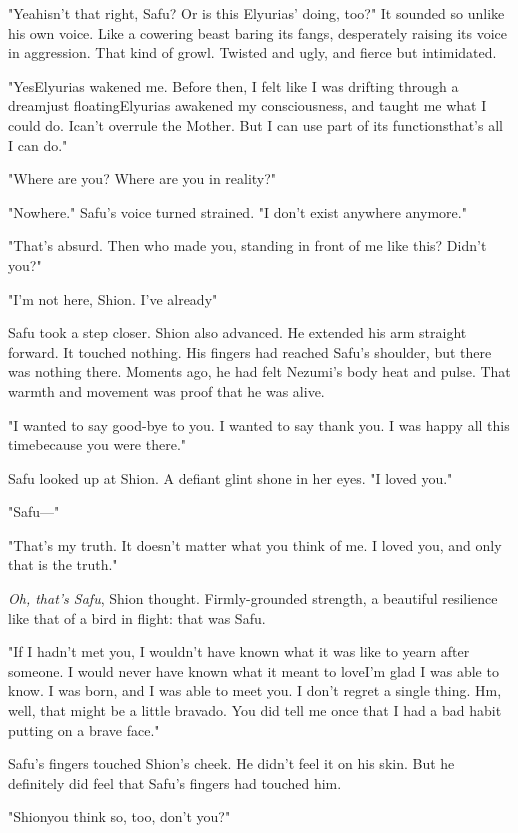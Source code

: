 "Yeah\el isn't that right, Safu? Or is this Elyurias' doing, too?" It
sounded so unlike his own voice. Like a cowering beast baring its fangs,
desperately raising its voice in aggression. That kind of growl. Twisted
and ugly, and fierce but intimidated.

"Yes\el Elyurias wakened me. Before then, I felt like I was drifting
through a dream\el just floating\el Elyurias awakened my consciousness,
and taught me what I could do. I\el can't overrule the Mother. But I can
use part of its functions\el that's all I can do."

"Where are you? Where are you in reality?"

"Nowhere." Safu's voice turned strained. "I don't exist anywhere
anymore."

"That's absurd. Then who made you, standing in front of me like this?
Didn't you?"

"I'm not here, Shion. I've already\el "

Safu took a step closer. Shion also advanced. He extended his arm
straight forward. It touched nothing. His fingers had reached Safu's
shoulder, but there was nothing there. Moments ago, he had felt Nezumi's
body heat and pulse. That warmth and movement was proof that he was
alive.

"I wanted to say good-bye to you. I wanted to say thank you. I was happy
all this time\el because you were there."

Safu looked up at Shion. A defiant glint shone in her eyes. "I loved
you."

"Safu---"

"That's my truth. It doesn't matter what you think of me. I loved you,
and only that is the truth."

\emph{Oh, that's Safu}, Shion thought. Firmly-grounded strength, a beautiful
resilience like that of a bird in flight: that was Safu.

"If I hadn't met you, I wouldn't have known what it was like to yearn
after someone. I would never have known what it meant to love\el I'm
glad I was able to know. I was born, and I was able to meet you. I don't
regret a single thing. Hm, well, that might be a little bravado. You did
tell me once that I had a bad habit putting on a brave face."

Safu's fingers touched Shion's cheek. He didn't feel it on his skin. But
he definitely did feel that Safu's fingers had touched him.

"Shion\el you think so, too, don't you?"

